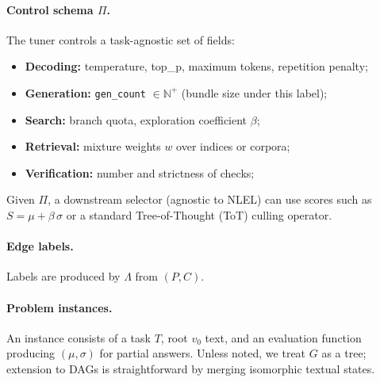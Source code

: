 \documentclass{article}
\theoremstyle{plain}
\theoremstyle{definition}
\theoremstyle{remark}
\begin{document}
\paragraph{Control schema $\Pi$.}
The tuner controls a task-agnostic set of fields:
\begin{itemize}
  \item \textbf{Decoding:} temperature, top\_p, maximum tokens, repetition penalty;
  \item \textbf{Generation:} \texttt{gen\_count} $\in \mathbb{N}^{+}$ (bundle size under this label);
  \item \textbf{Search:} branch quota, exploration coefficient $\beta$;
  \item \textbf{Retrieval:} mixture weights $w$ over indices or corpora;
  \item \textbf{Verification:} number and strictness of checks;
\end{itemize}
Given $\Pi$, a downstream selector (agnostic to NLEL) can use scores such as $S=\mu+\beta\,\sigma$ or a standard Tree-of-Thought (ToT) culling operator.

\paragraph{Edge labels.}
Labels are produced by $\Lambda$ from $(P,C)$.

\paragraph{Problem instances.}
An instance consists of a task $T$, root $v_0$ text, and an evaluation function producing $(\mu,\sigma)$ for partial answers.
Unless noted, we treat $G$ as a tree; extension to DAGs is straightforward by merging isomorphic textual states.
\end{document}
